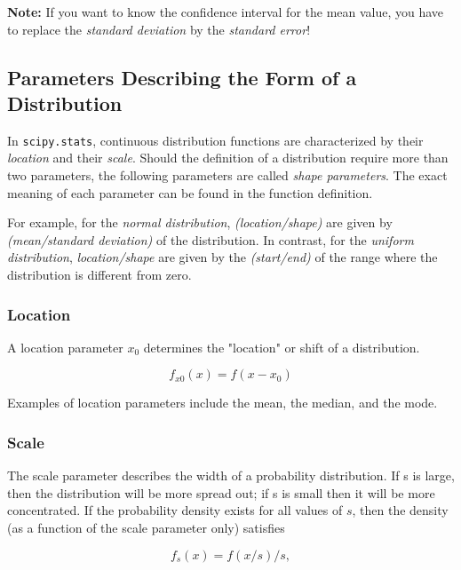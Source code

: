 \textbf{Note:} If you want to know the confidence interval for the mean value, you have to replace the \emph{standard deviation} by the \emph{standard error}!

\subsection{Parameters Describing the Form of a Distribution}

In \lstinline{scipy.stats}, continuous distribution functions are characterized by their \emph{location} and their \emph{scale}. Should the definition of a distribution require more than two parameters, the following parameters are called \emph{shape parameters}.  The exact meaning of each parameter can be found in the function definition.

For example, for the \emph{normal distribution}, \emph{(location/shape)} are given by \emph{(mean/standard deviation)} of the distribution. In contrast, for the \emph{uniform distribution}, \emph{location/shape} are given by the \emph{(start/end)} of the range where the distribution is different from zero.

\subsubsection{Location}

A \gls{location} parameter $x_0$  determines the "location" or shift of a distribution.

\begin{equation*}
  f_{x0}(x)=f(x-x_0)
\end{equation*}

Examples of location parameters include the mean, the median, and the mode.

\subsubsection{Scale}

The \gls{scale} parameter describes the width of a probability distribution.  If s is large, then the distribution will be more spread out; if s is small then it will be more concentrated. If the probability density exists for all values of $s$, then the density (as a function of the scale parameter only) satisfies

\begin{equation*}
   f_s(x) = f(x/s)/s,
\end{equation*}

